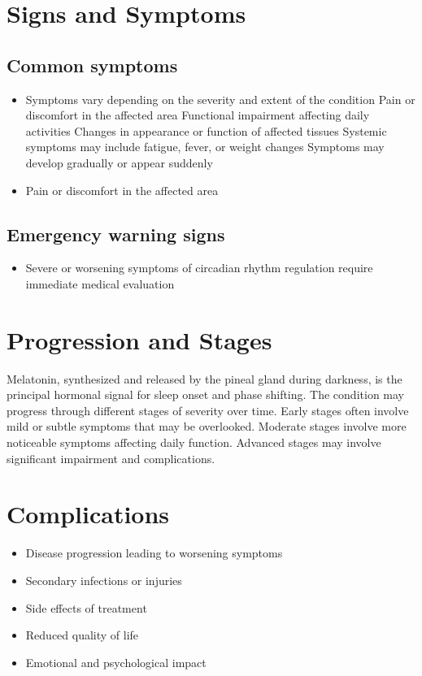 \section{Signs and Symptoms}

\subsection{Common symptoms}
\begin{itemize}[noitemsep]
  \item Symptoms vary depending on the severity and extent of the condition Pain or discomfort in the affected area Functional impairment affecting daily activities Changes in appearance or function of affected tissues Systemic symptoms may include fatigue, fever, or weight changes Symptoms may develop gradually or appear suddenly
  \item Pain or discomfort in the affected area
  \end{itemize}

\subsection{Emergency warning signs}
\begin{itemize}[noitemsep]
  \item Severe or worsening symptoms of circadian rhythm regulation require immediate medical evaluation
\end{itemize}
\section{Progression and Stages}
Melatonin, synthesized and released by the pineal gland during darkness, is the principal hormonal signal for sleep onset and phase shifting. The condition may progress through different stages of severity over time. Early stages often involve mild or subtle symptoms that may be overlooked. Moderate stages involve more noticeable symptoms affecting daily function. Advanced stages may involve significant impairment and complications.
\section{Complications}
\begin{itemize}[noitemsep]
  \item Disease progression leading to worsening symptoms
  \item Secondary infections or injuries
  \item Side effects of treatment
  \item Reduced quality of life
  \item Emotional and psychological impact
\end{itemize}

